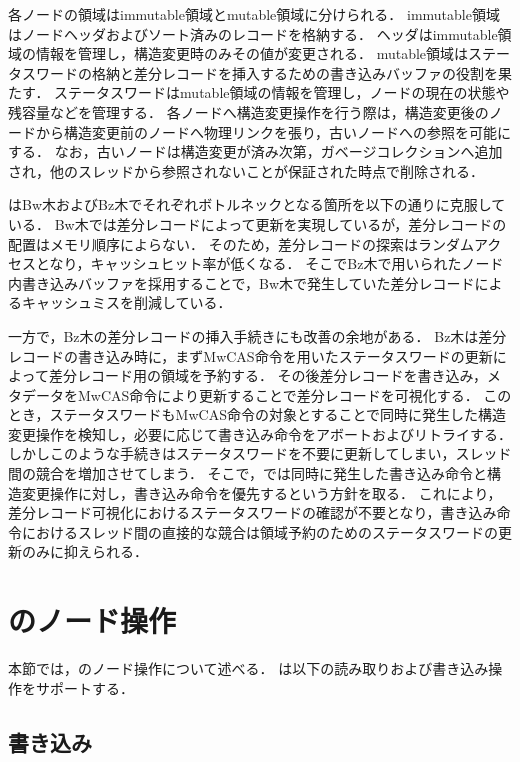 各ノードの領域はimmutable領域とmutable領域に分けられる．
immutable領域はノードヘッダおよびソート済みのレコードを格納する．
ヘッダはimmutable領域の情報を管理し，構造変更時のみその値が変更される．
mutable領域はステータスワードの格納と差分レコードを挿入するための書き込みバッファの役割を果たす．
ステータスワードはmutable領域の情報を管理し，ノードの現在の状態や残容量などを管理する．
各ノードへ構造変更操作を行う際は，構造変更後のノードから構造変更前のノードへ物理リンクを張り，古いノードへの参照を可能にする．
なお，古いノードは構造変更が済み次第，ガベージコレクションへ追加され，他のスレッドから参照されないことが保証された時点で削除される．

\Bctree{}はBw木およびBz木でそれぞれボトルネックとなる箇所を以下の通りに克服している．
Bw木では差分レコードによって更新を実現しているが，差分レコードの配置はメモリ順序によらない．
そのため，差分レコードの探索はランダムアクセスとなり，キャッシュヒット率が低くなる．
そこでBz木で用いられたノード内書き込みバッファを採用することで，Bw木で発生していた差分レコードによるキャッシュミスを削減している．

一方で，Bz木の差分レコードの挿入手続きにも改善の余地がある．
Bz木は差分レコードの書き込み時に，まずMwCAS命令を用いたステータスワードの更新によって差分レコード用の領域を予約する．
その後差分レコードを書き込み，メタデータをMwCAS命令により更新することで差分レコードを可視化する．
このとき，ステータスワードもMwCAS命令の対象とすることで同時に発生した構造変更操作を検知し，必要に応じて書き込み命令をアボートおよびリトライする．
しかしこのような手続きはステータスワードを不要に更新してしまい，スレッド間の競合を増加させてしまう．
そこで，\Bctree{}では同時に発生した書き込み命令と構造変更操作に対し，書き込み命令を優先するという方針を取る．
これにより，差分レコード可視化におけるステータスワードの確認が不要となり，書き込み命令におけるスレッド間の直接的な競合は領域予約のためのステータスワードの更新のみに抑えられる．

\section{\Bctree{}のノード操作}
\label{sec:node_operation}

本節では，\Bctree{}のノード操作について述べる．
\Bctree{}は以下の読み取りおよび書き込み操作をサポートする．

\subsection{書き込み}

